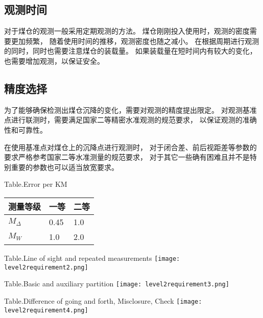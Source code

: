 \subsection{观测时间}
对于煤仓的观测一般采用定期观测的方法。
煤仓刚刚投入使用时，观测的密度需要更加频繁，
随着使用时间的推移，观测密度也随之减小。
在根据周期进行观测的同时，同时也需要注意煤仓的装载量。
如果装载量在短时间内有较大的变化，也需要增加观测，以保证安全。

\subsection{精度选择}
为了能够确保检测出煤仓沉降的变化，需要对观测的精度提出限定。
对观测基准点进行联测时，需要满足国家二等精密水准观测的规范要求，
以保证观测的准确性和可靠性。

在使用基准点对煤仓上的沉降点进行观测时，
对于闭合差、前后视距差等参数的要求严格参考国家二等水准测量的规范要求，
对于其它一些确有困难且并不是特别重要的参数也可以适当放宽要求。
\begin{table}[!htbp]
\begin{center}
			{Table.}{Error per KM}
\begin{tabularx}{15cm}{XXX}
\toprule
测量等级     &  一等     & 二等	 \\
\midrule
$M_\Delta$   &  0.45     & 1.0    \\
$M_W$     	 &  1.0      & 2.0    \\
\bottomrule
\end{tabularx}
\end{center}
\end{table}

\begin{table}[!htbp]
\begin{center}
			{Table.}{Line of sight and repeated measurements}
\texttt{[image: level2requirement2.png]}
\end{center}
\end{table}

\begin{table}[!htbp]
   \centering
			{Table.}{Basic and auxiliary partition}
   \texttt{[image: level2requirement3.png]}
\end{table}

\begin{table}[!htbp]
   \centering
			{Table.}{Difference of going and forth, Misclosure, Check}
   \texttt{[image: level2requirement4.png]}
\end{table}


